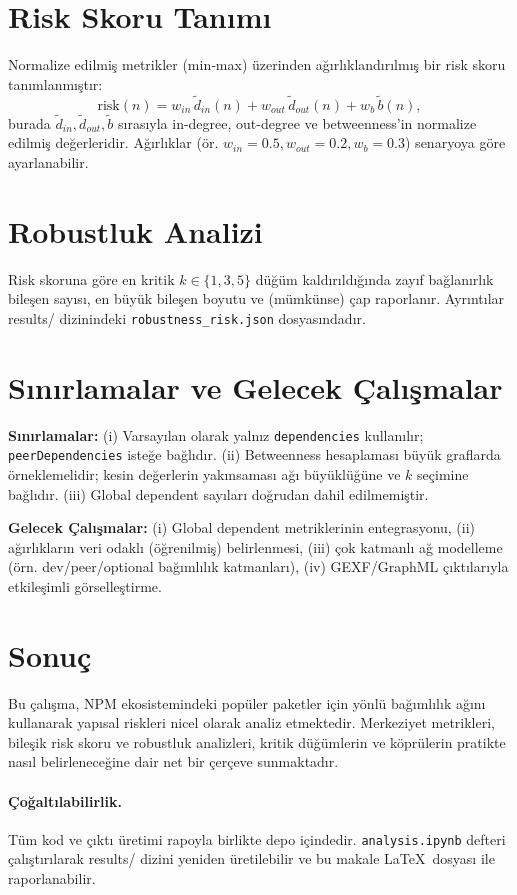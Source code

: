 \documentclass[11pt,a4paper]{article}
\begin{document}
\section{Risk Skoru Tanımı}
Normalize edilmiş metrikler (min‑max) üzerinden ağırlıklandırılmış bir risk skoru tanımlanmıştır:
\[
\mathrm{risk}(n) = w_{in}\,\tilde{d}_{in}(n) + w_{out}\,\tilde{d}_{out}(n) + w_{b}\,\tilde{b}(n),
\]
burada $\tilde{d}_{in},\tilde{d}_{out},\tilde{b}$ sırasıyla in-degree, out-degree ve betweenness'in normalize edilmiş değerleridir. Ağırlıklar (ör. $w_{in}=0.5, w_{out}=0.2, w_{b}=0.3$) senaryoya göre ayarlanabilir.

\section{Robustluk Analizi}
Risk skoruna göre en kritik $k\in\{1,3,5\}$ düğüm kaldırıldığında zayıf bağlanırlık bileşen sayısı, en büyük bileşen boyutu ve (mümkünse) çap raporlanır. Ayrıntılar results/ dizinindeki \texttt{robustness\_risk.json} dosyasındadır.

\section{Sınırlamalar ve Gelecek Çalışmalar}
\textbf{Sınırlamalar:} (i) Varsayılan olarak yalnız \texttt{dependencies} kullanılır; \texttt{peerDependencies} isteğe bağlıdır. (ii) Betweenness hesaplaması büyük graflarda örneklemelidir; kesin değerlerin yakınsaması ağı büyüklüğüne ve $k$ seçimine bağlıdır. (iii) Global dependent sayıları doğrudan dahil edilmemiştir.

\textbf{Gelecek Çalışmalar:} (i) Global dependent metriklerinin entegrasyonu, (ii) ağırlıkların veri odaklı (öğrenilmiş) belirlenmesi, (iii) çok katmanlı ağ modelleme (örn. dev/peer/optional bağımlılık katmanları), (iv) GEXF/GraphML çıktılarıyla etkileşimli görselleştirme.

\section{Sonuç}
Bu çalışma, NPM ekosistemindeki popüler paketler için yönlü bağımlılık ağını kullanarak yapısal riskleri nicel olarak analiz etmektedir. Merkeziyet metrikleri, bileşik risk skoru ve robustluk analizleri, kritik düğümlerin ve köprülerin pratikte nasıl belirleneceğine dair net bir çerçeve sunmaktadır.

\paragraph{Çoğaltılabilirlik.} Tüm kod ve çıktı üretimi rapoyla birlikte depo içindedir. \texttt{analysis.ipynb} defteri çalıştırılarak results/ dizini yeniden üretilebilir ve bu makale \LaTeX~dosyası ile raporlanabilir.
\end{document}
